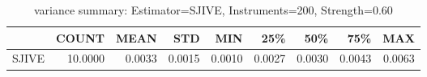\begin{table}[ht]
\centering
\caption{variance summary: Estimator=SJIVE, Instruments=200, Strength=0.60}
\begin{tabular}{lrrrrrrrr}
\toprule
 & COUNT & MEAN & STD & MIN & 25\% & 50\% & 75\% & MAX \\
\midrule
SJIVE & 10.0000 & 0.0033 & 0.0015 & 0.0010 & 0.0027 & 0.0030 & 0.0043 & 0.0063 \\
\bottomrule
\end{tabular}
\end{table}

